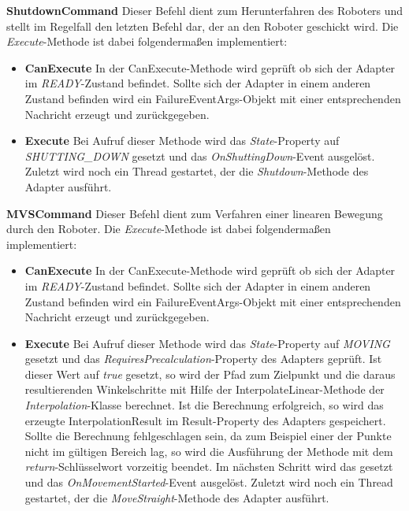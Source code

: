\textbf{ShutdownCommand}
\newline
Dieser Befehl dient zum Herunterfahren des Roboters und stellt im Regelfall den letzten Befehl dar, der an den Roboter geschickt wird. Die \textit{Execute}-Methode ist dabei folgendermaßen implementiert:
\begin{itemize}
\item \textbf{CanExecute}
\newline
In der CanExecute-Methode wird geprüft ob sich der Adapter im \textit{READY}-Zustand befindet. Sollte sich der Adapter in einem anderen Zustand befinden wird ein FailureEventArgs-Objekt mit einer entsprechenden Nachricht erzeugt und zurückgegeben.
\item \textbf{Execute}
\newline
Bei Aufruf dieser Methode wird das \textit{State}-Property auf \textit{SHUTTING\_DOWN} gesetzt und das \textit{OnShuttingDown}-Event ausgelöst. Zuletzt wird noch ein Thread gestartet, der die \textit{Shutdown}-Methode des Adapter ausführt.
\end{itemize}

\textbf{MVSCommand}
\newline
Dieser Befehl dient zum Verfahren einer linearen Bewegung durch den Roboter. Die \textit{Execute}-Methode ist dabei folgendermaßen implementiert:
\begin{itemize}
\item \textbf{CanExecute}
\newline
In der CanExecute-Methode wird geprüft ob sich der Adapter im \textit{READY}-Zustand befindet. Sollte sich der Adapter in einem anderen Zustand befinden wird ein FailureEventArgs-Objekt mit einer entsprechenden Nachricht erzeugt und zurückgegeben.
\item \textbf{Execute}
\newline
Bei Aufruf dieser Methode wird das \textit{State}-Property auf \textit{MOVING} gesetzt und das \textit{RequiresPrecalculation}-Property des Adapters geprüft. Ist dieser Wert auf \textit{true} gesetzt, so wird der Pfad zum Zielpunkt und die daraus resultierenden Winkelschritte mit Hilfe der InterpolateLinear-Methode der \textit{Interpolation}-Klasse berechnet. Ist die Berechnung erfolgreich, so wird das erzeugte InterpolationResult im Result-Property des Adapters gespeichert. Sollte die Berechnung fehlgeschlagen sein, da zum Beispiel einer der Punkte nicht im gültigen Bereich lag, so wird die Ausführung der Methode mit dem \textit{return}-Schlüsselwort vorzeitig beendet. Im nächsten Schritt wird das  gesetzt und das \textit{OnMovementStarted}-Event ausgelöst. Zuletzt wird noch ein Thread gestartet, der die \textit{MoveStraight}-Methode des Adapter ausführt.
\end{itemize}

